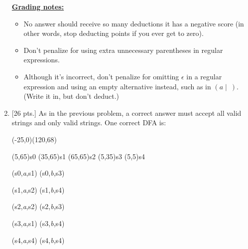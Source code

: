 \documentclass[11pt,fleqn]{article}
\begin{document}
\begin{enumerate}
\begin{info}{\textbf{\underline{Grading notes:}}}
\begin{itemize}
              \item No answer should receive so many deductions it has a
                    negative score (in other words, stop deducting points if
                    you ever get to zero).

              \item Don't penalize for using extra unnecessary parentheses
                    in regular expressions.

              \item Although it's incorrect, don't penalize for omitting
                    $\epsilon$ in a regular expression and using an empty
                    alternative instead, such as in $(a \mid \: )$.  (Write
                    it in, but don't deduct.)

            \end{itemize}

          \end{info}

          \pagebreak


    \item {[26 pts.]} As in the previous problem, a correct answer must
          accept all valid strings and only valid strings.  One correct DFA
          is:

          \begin{automaton}(-25,0)(120,68)


            (5,65){s0}
            \state(35,65){s1}
            \state[final](65,65){s2}
            \state[final](5,35){s3}
            \state(5,5){s4}

            \transition(s0,\emph{a},s1)
            \transition[labellocation=below](s0,\emph{b},s3)

            \transition(s1,\emph{a},s2)
            \transition(s1,\emph{b},s4)

            \transition[loopdirection=right](s2,\emph{a},s2)
            \transition(s2,\emph{b},s3)

            \transition(s3,\emph{a},s1)
            \transition(s3,\emph{b},s4)

            \transition[loopdirection=left](s4,\emph{a},s4)
            \transition[loopdirection=right](s4,\emph{b},s4)

          \end{automaton}


\end{enumerate}
\end{document}
